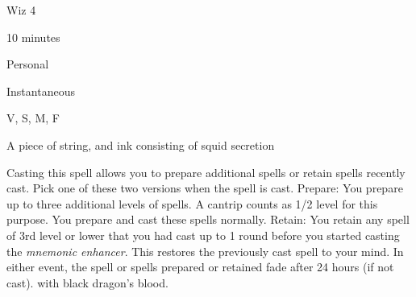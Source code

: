 
\begin{description*}
\item[Level:] Wiz 4
\item[Casting Time:] 10 minutes
\item[Range:] Personal
\item[Duration:] Instantaneous
\item[Components:] V, S, M, F
\item[Arcane Material Component:] A piece of string, and ink consisting of squid secretion
\end{description*}

Casting this spell allows you to prepare additional spells or retain spells recently
cast. Pick one of these two versions when the spell is cast.
Prepare: You prepare up to three additional levels of spells. A cantrip
counts as 1/2 level for this purpose. You prepare and cast these spells normally.
Retain: You retain any spell of 3rd level or lower that you had cast up
to 1 round before you started casting the \textit{mnemonic enhancer}. This restores
the previously cast spell to your mind.
In either event, the spell or spells prepared or retained fade after 24 hours (if
not cast).
with black dragon's blood.